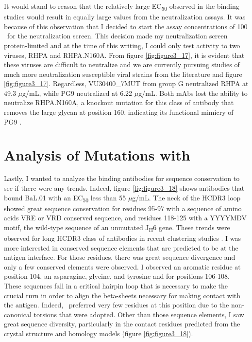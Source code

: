 It would stand to reason that the relatively large EC\textsubscript{50} observed in the binding studies would result in equally large \ic values from the neutralization assays. It was because of this observation that I decided to start the assay concentrations of 100 \mcml~for the neutralization screen. This decision made my neutralization screen protein-limited and at the time of this writing, I could only test activity to two viruses, RHPA and RHPA.N160A. From figure \ref{fig:figure3_17}, it is evident that these viruses are difficult to neutralize and we are currently pursuing studies of much more neutralization susceptible viral strains from the literature and figure \ref{fig:figure3_17}. Regardless, VU30400\_7MUT from group G neutralized RHPA at 49.3 $\mu$g/mL, while PG9 neutralized at 6.22 $\mu$g/mL. Both mAbs lost the ability to neutralize RHPA.N160A, a knockout mutation for this class of antibody that removes the large glycan at position 160, indicating its functional mimicry of PG9 \citep{Doores:2010gn}.

\section{Analysis of Mutations with \rosetta}
Lastly, I wanted to analyze the binding antibodies for sequence conservation to see if there were any trends. Indeed, figure \ref{fig:figure3_18} shows antibodies that bound BaL.01 with an EC\textsubscript{50} less than 55 $\mu$g/mL. The neck of the HCDR3 loop showed great sequence conservation for residues 95-97 with a sequence of amino acids VRE or VRD conserved sequence, and residues 118-125 with a YYYYMDV motif, the wild-type sequence of an unmutated J\textsubscript{H}6 gene. These trends were observed for long HCDR3 class of antibodies in recent clustering studies \citep{North:2011dv}. I was more interested in conserved sequence elements that are predicted to be at the antigen interface. For those residues, there was great sequence divergence and only a few conserved elements were observed. I observed an aromatic residue at position 104, an asparagine, glycine, and tyrosine and for positions 106-108. These sequences fall in a critical hairpin loop that is necessary to make the crucial turn in order to align the beta-sheets necessary for making contact with the antigen. Indeed, \rosetta~preferred very few residues at this position due to the non-canonical torsions that were adopted. Other than those sequence elements, I saw great sequence diversity, particularly in the contact residues predicted from the crystal structure and homology models (figure \ref{fig:figure3_18}).

